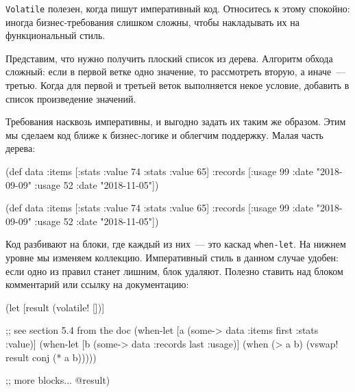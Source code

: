 \verb|Volatile| полезен, когда пишут императивный код. Относитесь к этому
спокойно: иногда бизнес-требования слишком сложны, чтобы накладывать их на
функциональный стиль.

Представим, что нужно получить плоский список из дерева. Алгоритм обхода
сложный: если в первой ветке одно значение, то рассмотреть вторую, а иначе~---
третью. Когда для первой и третьей веток выполняется некое условие, добавить в
список произведение значений.


Требования насквозь императивны, и выгодно задать их таким же образом. Этим мы
сделаем код ближе к бизнес-логике и облегчим поддержку. Малая часть дерева:

\ifnarrow

\begin{english}
  \begin{clojure}
(def data
  {:items [{:stats {:value 74}}
           {:stats {:value 65}}]
   :records [{:usage 99
              :date "2018-09-09"}
             {:usage 52
              :date "2018-11-05"}]})
  \end{clojure}
\end{english}

\else

\begin{english}
  \begin{clojure}
(def data
  {:items [{:stats {:value 74}}
           {:stats {:value 65}}]
   :records [{:usage 99 :date "2018-09-09"}
             {:usage 52 :date "2018-11-05"}]})
  \end{clojure}
\end{english}

\fi

Код разбивают на блоки, где каждый из них~--- это каскад \verb|when-let|. На
нижнем уровне мы изменяем коллекцию. Императивный стиль в данном случае удобен:
если одно из правил станет лишним, блок удаляют. Полезно ставить над блоком
комментарий или ссылку на документацию:

\ifnarrow

\begin{english}
  \begin{clojure}
(let [result (volatile! [])]

  ;; see section 5.4 from the doc
  (when-let [a (some-> data
                       :items
                       first
                       :stats
                       :value)]
    (when-let [b (some-> data
                       :records
                       last
                       :usage)]
      (when (> a b)
        (vswap! result conj (* a b)))))

  ;; more blocks...
  @result)
  \end{clojure}
\end{english}

